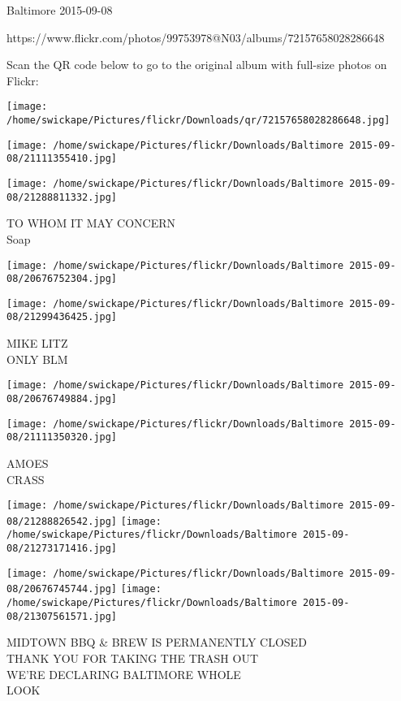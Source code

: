 \documentclass[10pt,letterpaper]{article}
\begin{document}
Baltimore 2015-09-08

https://www.flickr.com/photos/99753978@N03/albums/72157658028286648

Scan the QR code below to go to the original album with full-size photos on Flickr:

\texttt{[image: /home/swickape/Pictures/flickr/Downloads/qr/72157658028286648.jpg]}
\pagebreak

\texttt{[image: /home/swickape/Pictures/flickr/Downloads/Baltimore 2015-09-08/21111355410.jpg]}

\vspace{0.25in}
\texttt{[image: /home/swickape/Pictures/flickr/Downloads/Baltimore 2015-09-08/21288811332.jpg]}

TO WHOM IT MAY CONCERN\\
Soap
\pagebreak

\texttt{[image: /home/swickape/Pictures/flickr/Downloads/Baltimore 2015-09-08/20676752304.jpg]}

\vspace{0.25in}
\texttt{[image: /home/swickape/Pictures/flickr/Downloads/Baltimore 2015-09-08/21299436425.jpg]}

MIKE LITZ\\
ONLY BLM
\pagebreak

\texttt{[image: /home/swickape/Pictures/flickr/Downloads/Baltimore 2015-09-08/20676749884.jpg]}

\vspace{0.25in}
\texttt{[image: /home/swickape/Pictures/flickr/Downloads/Baltimore 2015-09-08/21111350320.jpg]}

AMOES\\
CRASS
\pagebreak

\texttt{[image: /home/swickape/Pictures/flickr/Downloads/Baltimore 2015-09-08/21288826542.jpg]}
\texttt{[image: /home/swickape/Pictures/flickr/Downloads/Baltimore 2015-09-08/21273171416.jpg]}

\texttt{[image: /home/swickape/Pictures/flickr/Downloads/Baltimore 2015-09-08/20676745744.jpg]}
\texttt{[image: /home/swickape/Pictures/flickr/Downloads/Baltimore 2015-09-08/21307561571.jpg]}

MIDTOWN BBQ \& BREW IS PERMANENTLY CLOSED\\
THANK YOU FOR TAKING THE TRASH OUT\\
WE'RE DECLARING BALTIMORE WHOLE\\
LOOK
\pagebreak
\end{document}
